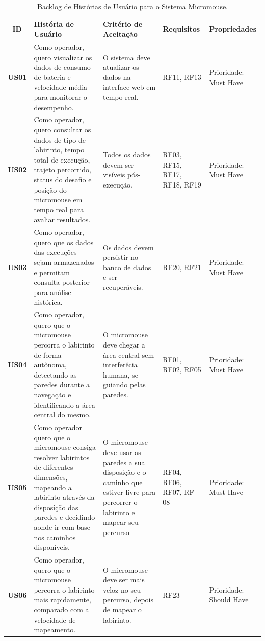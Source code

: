 \begin{table}[htbp]
\begin{center}
\scriptsize
\setlength{\tabcolsep}{4pt}
\renewcommand{\arraystretch}{1.5} %
\caption{Backlog de Histórias de Usuário para o Sistema Micromouse.}
\begin{tabular}{|c|p{5cm}|p{4cm}|p{2cm}|p{2cm}|}
\hline
\textbf{ID} & \textbf{História de Usuário} & \textbf{Critério de Aceitação} & \textbf{Requisitos} & \textbf{Propriedades} \\
\hline

\textbf{US01} & Como operador, quero visualizar os dados de consumo de bateria e velocidade média para monitorar o desempenho. & O sistema deve atualizar os dados na interface web em tempo real. & RF11, RF13 & Prioridade: Must Have \\ \hline

\textbf{US02} & Como operador, quero consultar os dados de tipo de labirinto, tempo total de execução, trajeto percorrido, status do desafio e posição do micromouse em tempo real para avaliar resultados. & Todos os dados devem ser  visíveis pós-execução. & RF03, RF15, RF17, RF18, RF19 & Prioridade: Must Have \\ \hline

\textbf{US03} & Como operador, quero que os dados das execuções sejam armazenados e permitam consulta posterior para análise histórica. & Os dados devem persistir no banco de dados e ser recuperáveis. & RF20, RF21 & Prioridade: Must Have \\ \hline

\textbf{US04} & Como operador, quero que o micromouse percorra o labirinto de forma autônoma, detectando as paredes durante a navegação e identificando a área central do mesmo.& O micromouse deve chegar a área central sem interferêcia humana, se guiando pelas paredes. & RF01, RF02, RF05 & Prioridade: Must Have 
\\ \hline

\textbf{US05} & Como operador quero que o micromouse consiga resolver labirintos de diferentes dimensões, mapeando a labirinto através da disposição das paredes e decidindo aonde ir com base nos caminhos disponíveis. & O micromouse deve usar as paredes a sua disposição e o caminho que estiver livre para percorrer o labirinto e mapear seu percurso & RF04, RF06, RF07, RF 08 & Prioridade: Must Have 
\\ \hline

\textbf{US06} & Como operador, quero que o micromouse percorra o labirinto mais rapidamente, comparado com a velocidade de mapeamento. & O micromouse deve ser mais veloz no seu percurso, depois de mapear o labirinto. & RF23 & Prioridade: Should Have \\ \hline


\end{tabular}
\end{center}
\end{table}
